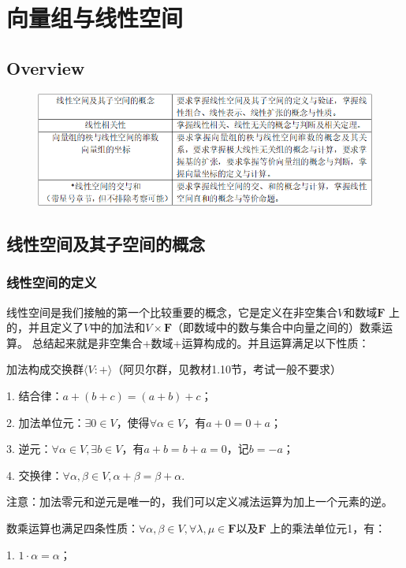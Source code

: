 \chapter{向量组与线性空间}

\section{Overview}
\begin{figure}[h]
	\centering
	\includegraphics[scale=0.58]{1.png}
\end{figure}

\section{线性空间及其子空间的概念}
\subsection{线性空间的定义}
线性空间是我们接触的第一个比较重要的概念，它是定义在非空集合$V$和数域$\mathbf{F}$
上的，并且定义了$V$中的加法和$V\times \mathbf{F}$（即数域中的数与集合中向量之间的）数乘运算。
总结起来就是非空集合+数域+运算构成的。并且运算满足以下性质：

加法构成交换群$\langle V:+\rangle$（阿贝尔群，见教材1.10节，考试一般不要求）

1. 结合律：$a+(b+c)=(a+b)+c$；

2. 加法单位元：$\exists 0 \in V$，使得$\forall\alpha\in V$，有$a+0=0+a$；

3. 逆元：$\forall\alpha\in V,\exists b\in V$，有$a+b=b+a=0$，记$b=-a$；

4. 交换律：$\forall\alpha,\beta\in V, \alpha+\beta=\beta+\alpha$.

注意：加法零元和逆元是唯一的，我们可以定义减法运算为加上一个元素的逆。

数乘运算也满足四条性质：$\forall \alpha,\beta \in V,\forall \lambda,\mu\in\mathbf{F}$以及$\mathbf{F}$
上的乘法单位元1，有：

1. $1\cdot \alpha=\alpha$；

